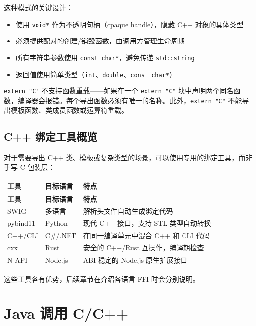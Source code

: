 \documentclass[12pt,a4paper,fontset=fandol]{ctexbook}
\newcommand{\cpp}[1]{C++#1}
\begin{document}
这种模式的关键设计：
\begin{itemize}[nosep]
\item 使用 \texttt{void*} 作为不透明句柄（opaque handle），隐藏 C++ 对象的具体类型
\item 必须提供配对的创建/销毁函数，由调用方管理生命周期
\item 所有字符串参数使用 \texttt{const char*}，避免传递 \texttt{std::string}
\item 返回值使用简单类型（\texttt{int}、\texttt{double}、\texttt{const char*}）
\end{itemize}

\begin{tcolorbox}[warning={extern "C" 的限制}]
\texttt{extern "C"} 不支持函数重载——如果在一个 \texttt{extern "C"} 块中声明两个同名函数，编译器会报错。每个导出函数必须有唯一的名称。此外，\texttt{extern "C"} 不能导出模板函数、类成员函数或运算符重载。
\end{tcolorbox}

\section{C++ 绑定工具概览}

对于需要导出 \cpp{} 类、模板或复杂类型的场景，可以使用专用的绑定工具，而非手写 C 包装层：

\begin{longtable}{lp{3cm}p{5.5cm}}
\toprule
\textbf{工具} & \textbf{目标语言} & \textbf{特点} \\
\midrule
\endfirsthead
\toprule
\textbf{工具} & \textbf{目标语言} & \textbf{特点} \\
\midrule
\endhead
SWIG          & 多语言          & 解析头文件自动生成绑定代码 \\
pybind11      & Python          & 现代 \cpp{} 接口，支持 STL 类型自动转换 \\
C++/CLI       & C\#/.NET        & 在同一编译单元中混合 \cpp{} 和 CLI 代码 \\
cxx           & Rust            & 安全的 \cpp{}/Rust 互操作，编译期检查 \\
N-API         & Node.js         & ABI 稳定的 Node.js 原生扩展接口 \\
\bottomrule
\end{longtable}

这些工具各有优势，后续章节在介绍各语言 FFI 时会分别说明。


\chapter{Java 调用 C/C++}
\end{document}
